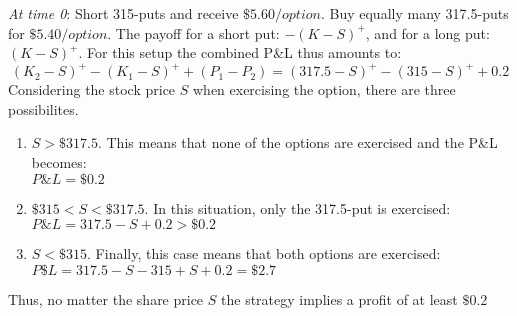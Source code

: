 \documentclass{article}
\begin{document}
\textit{At time 0}: Short 315-puts and receive $\$5.60 / option$. Buy equally many 317.5-puts for $\$5.40/option$.
The payoff for a short put: $-(K-S)^+$, and for a long put: $(K-S)^+$. For this setup the combined P\&L thus amounts to:
$$(K_2-S)^+ -(K_1-S)^+ + (P_1 - P_2) = (317.5-S)^+ - (315-S)^+ + 0.2$$
Considering the stock price $S$ when exercising the option, there are three possibilites.
\begin{enumerate}
	\item $S > \$317.5$. This means that none of the options are exercised and the P\&L becomes: \\ $P\&L = \$0.2$
	\item $\$315 < S < \$317.5$. In this situation, only the 317.5-put is exercised: \\ $P\&L = 317.5 - S + 0.2 > \$0.2$
	\item $S < \$315$. Finally, this case means that both options are exercised: \\$P\$L = 317.5 - S - 315 + S + 0.2 = \$2.7$
\end{enumerate}
Thus, no matter the share price $S$ the strategy implies a profit of at least $\$0.2$
\end{document}
